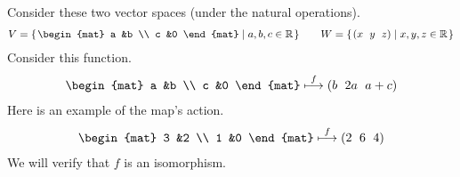 \documentclass[10pt,t]{beamer}
\begin{document}
\begin{frame}
\ex Consider these two vector spaces (under the natural operations).
\begin{equation*}
  V=\set{
    \begin{mat}
      a &b \\
      c &0
    \end{mat}
    \suchthat a,b,c\in\Re}
  \qquad
  W=\set{\rowvec{x &y &z}\suchthat x,y,z\in\Re}
\end{equation*}
Consider this function.
\begin{equation*}
  \begin{mat}
    a &b \\
    c &0
  \end{mat}
  \mapsunder{f}
  \rowvec{b &2a &a+c}
\end{equation*}
Here is an example of the map's action.
\begin{equation*}
  \begin{mat}
    3 &2 \\
    1 &0
  \end{mat}
  \mapsunder{f}
  \rowvec{2 &6 &4}
\end{equation*}
We will verify that $f$
is an isomorphism.
\end{frame}
\end{document}
